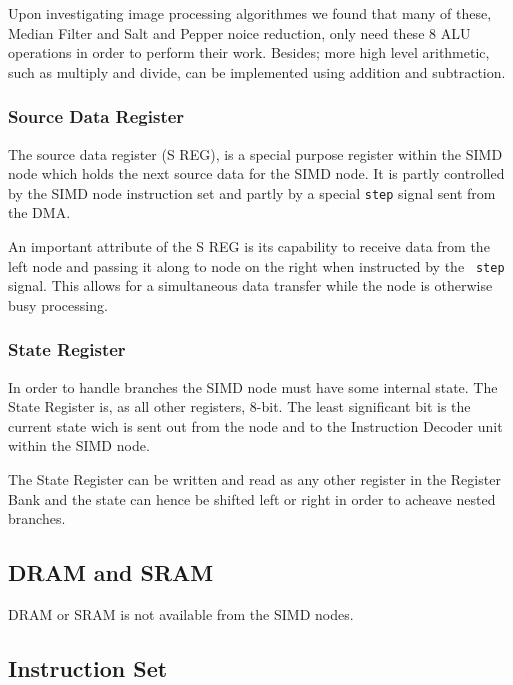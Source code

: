 Upon investigating image processing algorithmes we found that many of these,
Median Filter and Salt and Pepper noice reduction, only need these 8 \ac{ALU}
operations in order to perform their work. Besides; more high level arithmetic,
such as multiply and divide, can be implemented using addition and subtraction.

\subsubsection{Source Data Register}
The source data register (S REG), is a special purpose register within the
\ac{SIMD} node which holds the next source data for the \ac{SIMD} node. It is
partly controlled by the \ac{SIMD} node instruction set and partly by a special
{\tt step} signal sent from the \ac{DMA}.

An important attribute of the S REG is its capability to receive data from the
left node and passing it along to node on the right when instructed by the {\tt
  step} signal. This allows for a simultaneous data transfer while the node is
otherwise busy processing.

\subsubsection{State Register}
In order to handle branches the \ac{SIMD} node must have some internal
state. The State Register is, as all other registers, 8-bit. The least
significant bit is the current state wich is sent out from the node and to the
Instruction Decoder unit within the \ac{SIMD} node.

The State Register can be written and read as any other register in the Register
Bank and the state can hence be shifted left or right in order to acheave nested
branches.

\subsection{DRAM and SRAM}


\ac{DRAM} or \ac{SRAM} is not available from the \ac{SIMD} nodes.

\subsection{Instruction Set}



